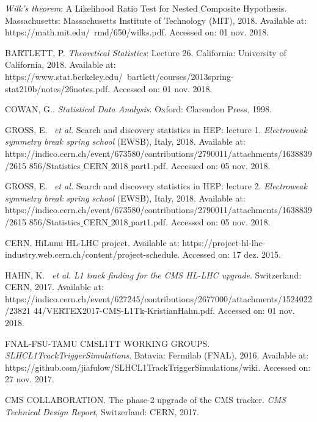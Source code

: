 \begin{thebibliography}{}
\textit{Wilk’s theorem}; A Likelihood Ratio Test for Nested Composite Hypothesis. Massachusetts: Massachusetts Institute of Technology (MIT), 2018. Available at: https://math.mit.edu/~rmd/650/wilks.pdf. Accessed on: 01 nov. 2018.

BARTLETT, P. \textit{Theoretical Statistics}: Lecture 26. California: University of California, 2018. Available at: https://www.stat.berkeley.edu/~bartlett/courses/2013spring-stat210b/notes/26notes.pdf. Accessed on: 01 nov. 2018.

COWAN, G.. \textit{Statistical Data Analysis}. Oxford: Clarendon Press, 1998.

GROSS, E. ~\textit{et al.} Search and discovery statistics in HEP: lecture 1. \textit{Electroweak symmetry break spring school} (EWSB), Italy, 2018. Available at: https://indico.cern.ch/event/673580/contributions/2790011/attachments/1638839/2615 856/Statistics$\_$CERN$\_$2018$\_$part1.pdf. Accessed on: 05 nov. 2018.

GROSS, E. ~\textit{et al.} Search and discovery statistics in HEP: lecture 2. \textit{Electroweak symmetry break spring school} (EWSB), Italy, 2018. Available at: https://indico.cern.ch/event/673580/contributions/2790011/attachments/1638839/2615 856/Statistics$\_$CERN$\_$2018$\_$part1.pdf. Accessed on: 05 nov. 2018.


CERN. HiLumi HL-LHC project. 
Available at: https://project-hl-lhc-industry.web.cern.ch/content/project-schedule. Accessed on: 17 dez. 2015.

HAHN, K. ~\textit{et al.} \textit{L1 track finding for the CMS HL-LHC upgrade}. Switzerland: CERN, 2017. Available at: https://indico.cern.ch/event/627245/contributions/2677000/attachments/1524022/23821 44/VERTEX2017-CMS-L1Tk-KristianHahn.pdf. Accessed on: 01 nov. 2018.

FNAL-FSU-TAMU CMSL1TT WORKING GROUPS. \textit{SLHCL1TrackTriggerSimulations}. Batavia: Fermilab (FNAL), 2016. Available at: https://github.com/jiafulow/SLHCL1TrackTriggerSimulations/wiki. Accessed on: 27 nov. 2017.

CMS COLLABORATION. The phase-2 upgrade of the CMS tracker. \textit{CMS Technical Design Report}, Switzerland: CERN, 2017.


\end{thebibliography}
